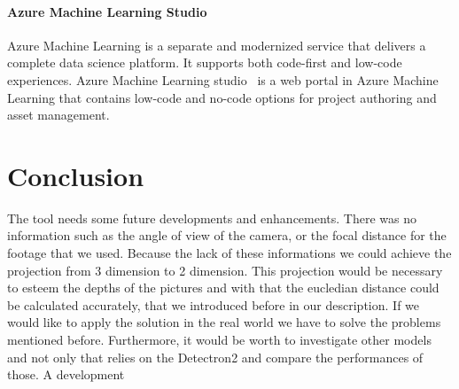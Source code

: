 \subsubsection{Azure Machine Learning Studio}
Azure Machine Learning is a separate and modernized service that delivers a complete data science platform. It supports both code-first and low-code experiences. Azure Machine Learning studio~\cite{studio} is a web portal in Azure Machine Learning that contains low-code and no-code options for project authoring and asset management.


\chapter{Conclusion}
The tool needs some future developments and enhancements. There was no information such as the angle of view of the camera, or the focal distance for the footage that we used. Because the lack of these informations we could achieve the projection from 3 dimension to 2 dimension. This projection would be necessary to esteem the depths of the pictures and with that the eucledian distance could be calculated accurately, that we introduced before in our description. If we would like to apply the solution in the real world we have to solve the problems mentioned before.  Furthermore, it would be worth to investigate other models and not only that relies on the Detectron2 and compare the performances of those. A development
